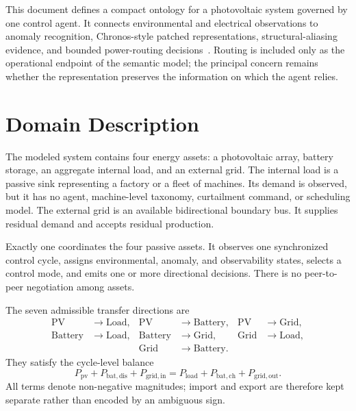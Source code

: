 This document defines a compact ontology for a photovoltaic system governed by one control agent. It connects environmental and electrical observations to anomaly recognition, Chronos-style patched representations, structural-aliasing evidence, and bounded power-routing decisions~\cite{ansariChronosLearningLanguage2024}. Routing is included only as the operational endpoint of the semantic model; the principal concern remains whether the representation preserves the information on which the agent relies.

\section{Domain Description}

The modeled system contains four energy assets: a photovoltaic array, battery storage, an aggregate internal load, and an external grid. The internal load is a passive sink representing a factory or a fleet of machines. Its demand is observed, but it has no agent, machine-level taxonomy, curtailment command, or scheduling model. The external grid is an available bidirectional boundary bus. It supplies residual demand and accepts residual production.

Exactly one  coordinates the four passive assets. It observes one synchronized control cycle, assigns environmental, anomaly, and observability states, selects a control mode, and emits one or more directional decisions. There is no peer-to-peer negotiation among assets.

The seven admissible transfer directions are
\begin{equation}
\label{eq:routes}
\begin{aligned}
\mathrm{PV}&\rightarrow\mathrm{Load}, &
\mathrm{PV}&\rightarrow\mathrm{Battery}, &
\mathrm{PV}&\rightarrow\mathrm{Grid},\\
\mathrm{Battery}&\rightarrow\mathrm{Load}, &
\mathrm{Battery}&\rightarrow\mathrm{Grid}, &
\mathrm{Grid}&\rightarrow\mathrm{Load},\\
&&\mathrm{Grid}&\rightarrow\mathrm{Battery}.&&
\end{aligned}
\end{equation}
They satisfy the cycle-level balance
\begin{equation}
\label{eq:power-balance}
P_{\mathrm{pv}}+P_{\mathrm{bat,dis}}+P_{\mathrm{grid,in}}
=P_{\mathrm{load}}+P_{\mathrm{bat,ch}}+P_{\mathrm{grid,out}}.
\end{equation}
All terms denote non-negative magnitudes; import and export are therefore kept separate rather than encoded by an ambiguous sign.

